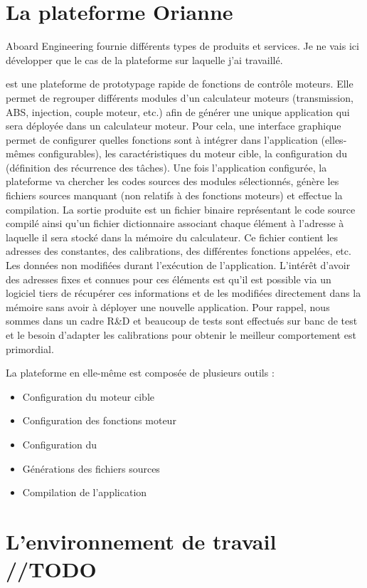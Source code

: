 \section{La plateforme Orianne}
\label{sec:orianne}

Aboard Engineering fournie différents types de produits et services. Je ne vais ici développer que le cas de la plateforme  sur laquelle j'ai travaillé.

 est une plateforme de prototypage rapide de fonctions de contrôle moteurs.
Elle permet de regrouper différents modules d'un calculateur moteurs (transmission, ABS, injection, couple moteur, etc.) afin de générer une unique application qui sera déployée dans un calculateur moteur.
Pour cela, une interface graphique permet de configurer quelles fonctions sont à intégrer dans l'application (elles-mêmes configurables), les caractéristiques du moteur cible, la configuration du  (définition des récurrence des tâches).
Une fois l'application configurée, la plateforme va chercher les codes sources des modules sélectionnés, génère les fichiers sources manquant (non relatifs à des fonctions moteurs) et  effectue la compilation.
La sortie produite est un fichier binaire représentant le code source compilé ainsi qu'un fichier \og dictionnaire \fg{} associant chaque élément à l'adresse à laquelle il sera stocké dans la mémoire du calculateur. Ce fichier contient les adresses des constantes, des calibrations, des différentes fonctions appelées, etc. Les données non modifiées durant l'exécution de l'application.
L'intérêt d'avoir des adresses fixes et connues pour ces éléments est qu'il est possible via un logiciel tiers de récupérer ces informations et de les modifiées directement dans la mémoire sans avoir à déployer une nouvelle application. Pour rappel, nous sommes dans un cadre R\&D et beaucoup de tests sont effectués sur banc de test et le besoin d'adapter les calibrations pour obtenir le meilleur comportement est primordial.

La plateforme en elle-même est composée de plusieurs outils :
\begin{itemize}
	\item Configuration du moteur cible
	\item Configuration des fonctions moteur
	\item Configuration du 
	\item Générations des fichiers sources
	\item Compilation de l'application
\end{itemize}

\section{L'environnement de travail //TODO}
\lipsum
